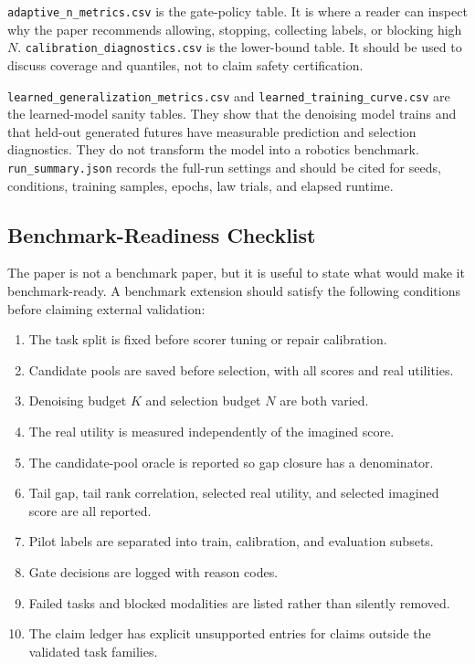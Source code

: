 \documentclass{article}
\begin{document}
\texttt{adaptive\_n\_metrics.csv} is the gate-policy table. It is where a
reader can inspect why the paper recommends allowing, stopping, collecting
labels, or blocking high $N$. \texttt{calibration\_diagnostics.csv} is the
lower-bound table. It should be used to discuss coverage and quantiles, not to
claim safety certification.

\texttt{learned\_generalization\_metrics.csv} and
\texttt{learned\_training\_curve.csv} are the learned-model sanity tables.
They show that the denoising model trains and that held-out generated futures
have measurable prediction and selection diagnostics. They do not transform
the model into a robotics benchmark. \texttt{run\_summary.json} records the
full-run settings and should be cited for seeds, conditions, training samples,
epochs, law trials, and elapsed runtime.

\subsection{Benchmark-Readiness Checklist}
\label{app:v4-benchmark-readiness}

The paper is not a benchmark paper, but it is useful to state what would make
it benchmark-ready. A benchmark extension should satisfy the following
conditions before claiming external validation:
\begin{enumerate}
\item The task split is fixed before scorer tuning or repair calibration.
\item Candidate pools are saved before selection, with all scores and real
utilities.
\item Denoising budget $K$ and selection budget $N$ are both varied.
\item The real utility is measured independently of the imagined score.
\item The candidate-pool oracle is reported so gap closure has a denominator.
\item Tail gap, tail rank correlation, selected real utility, and selected
imagined score are all reported.
\item Pilot labels are separated into train, calibration, and evaluation
subsets.
\item Gate decisions are logged with reason codes.
\item Failed tasks and blocked modalities are listed rather than silently
removed.
\item The claim ledger has explicit unsupported entries for claims outside the
validated task families.
\end{enumerate}
\end{document}
